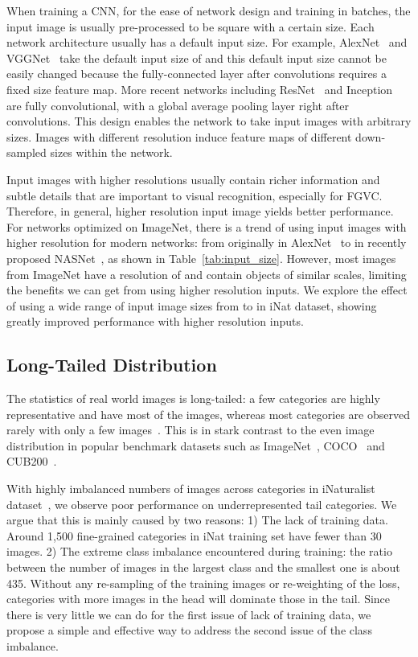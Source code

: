 \documentclass[10pt,twocolumn,letterpaper]{article}
\begin{document}
When training a CNN, for the ease of network design and training in batches, the input image is usually pre-processed to be square with a certain size.
Each network architecture usually has a default input size.
For example, AlexNet~\cite{alexnet} and VGGNet~\cite{vggnet} take the default input size of  and this default input size cannot be easily changed because the fully-connected layer after convolutions requires a fixed size feature map.
More recent networks including ResNet~\cite{resnet} and Inception~\cite{googlenet, inception-v3, inception-v4} are fully convolutional, with a global average pooling layer right after convolutions.
This design enables the network to take input images with arbitrary sizes.
Images with different resolution induce feature maps of different down-sampled sizes within the network.

Input images with higher resolutions usually contain richer information and subtle details that are important to visual recognition, especially for FGVC.
Therefore, in general, higher resolution input image yields better performance.
For networks optimized on ImageNet, there is a trend of using input images with higher resolution for modern networks: from originally  in AlexNet~\cite{alexnet} to  in recently proposed NASNet~\cite{nasnet}, as shown in Table\ \ref{tab:input_size}.
However, most images from ImageNet have a resolution of  and contain objects of similar scales, limiting the benefits we can get from using higher resolution inputs.
We explore the effect of using a wide range of input image sizes from  to  in iNat dataset, showing greatly improved performance with higher resolution inputs.



\subsection{Long-Tailed Distribution}
\label{sec:long-tailed}

The statistics of real world images is long-tailed: a few categories are highly representative and have most of the images, whereas most categories are observed rarely with only a few images~\cite{long-tail_object, van2017devil}.
This is in stark contrast to the even image distribution in popular benchmark datasets such as ImageNet~\cite{imagenet}, COCO~\cite{coco} and CUB200~\cite{cub200}.

With highly imbalanced numbers of images across categories in iNaturalist dataset~\cite{inaturalist}, we observe poor performance on underrepresented tail categories.
We argue that this is mainly caused by two reasons: 
1) The lack of training data. Around 1,500 fine-grained categories in iNat training set have fewer than 30 images. 
2) The extreme class imbalance encountered during training: the ratio between the number of images in the largest class and the smallest one is about 435.
Without any re-sampling of the training images or re-weighting of the loss, categories with more images in the head will dominate those in the tail.
Since there is very little we can do for the first issue of lack of training data, we propose a simple and effective way to address the second issue of the class imbalance.
\end{document}
